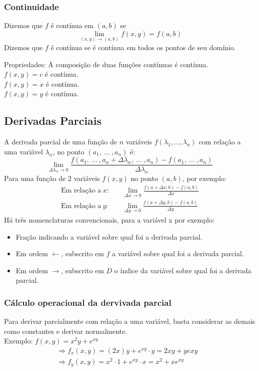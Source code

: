 \documentclass{article}
\begin{document}
\subsubsection{Continuidade}
Dizemos que $f$ é contínua em $(a,b)$ se
\[ \lim_{(x,y) \to (a,b)} f(x,y) = f(a,b) \]
Dizemos que $f$ é contínua se é contínua em todos os pontos de seu domínio.
\begin{tabbing}
  Propriedades: \= A composição de duas funções contínuas é contínua.\\
  \> $f(x,y) = c$ é contínua.\\
  \> $f(x,y) = x$ é contínua.\\
  \> $f(x,y) = y$ é contínua.
\end{tabbing}


\pagebreak


\subsection{Derivadas Parciais}
A derivada parcial de uma função de $n$ variáveis $f(\lambda_1, \hdots, \lambda_n)$ com relação a uma variável $\lambda_\alpha$, no ponto $(a_1, \> \hdots \> , a_n)$ é:
\[ \lim_{\Delta \lambda_\alpha \to 0} \frac{f(a_1, \> \hdots \> , a_\alpha + \Delta \lambda_\alpha, \> \hdots \> , a_n) - f(a_1, \> \hdots \> , a_n)}{\Delta \lambda_\alpha} \]
Para uma função de 2 variáveis $f(x,y)$ no ponto $(a, b)$, por exemplo:
\begin{align*}
  \text{Em relação a}\ x:& \quad \lim_{\Delta x \to 0} \frac{f(a + \Delta x, b) - f(a, b)}{\Delta x} \\[5pt]
  \text{Em relação a}\ y:& \quad \lim_{\Delta y \to 0} \frac{f(a + \Delta y, b) - f(a, b)}{\Delta y}
\end{align*}
Há três nomenclaturas convencionais, para a variável x por exemplo:
\begin{itemize}
\item{ Fração indicando a variável sobre qual foi a derivada parcial.}
\item{ Em ordem $\leftarrow$, subscrito em $f$ a variável sobre qual foi a derivada parcial.}
\item{ Em ordem $\rightarrow$, subscrito em $D$ o índice da variável sobre qual foi a derivada parcial.}
\end{itemize}

\subsubsection{Cálculo operacional da dervivada parcial}
Para derivar parcialmente com relação a uma variável, basta considerar as demais como constantes e derivar normalmente.\\[5pt]
Exemplo: $f(x,y) = x^2y + e^{xy}$
\begin{align*}
  & \Rightarrow f_x(x,y) = (2x)y + e^{xy} \cdot y = 2xy + ye{xy}&& \\[5pt]
  & \Rightarrow f_y(x,y) = x^2 \cdot 1 + e^{xy}\cdot x = x^2 + xe^{xy} &&
\end{align*}
\end{document}
